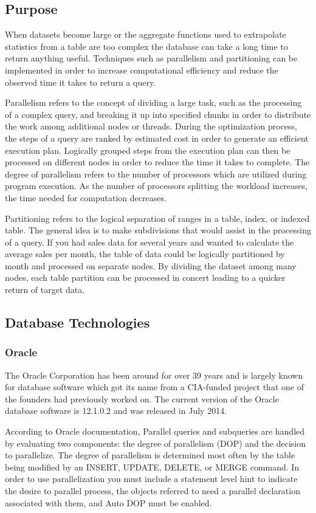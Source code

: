 \documentclass[draftclsnofoot, onecolumn, compsoc, 10pt]{IEEEtran}
\begin{document}
\subsection{Purpose}
When datasets become large or the aggregate functions used to extrapolate statistics from a table are too complex the database can take a long time to return anything useful.
Techniques such as parallelism and partitioning can be implemented in order to increase computational efficiency and reduce the observed time it takes to return a query. 

Parallelism refers to the concept of dividing a large task, such as the processing of a complex query, and breaking it up into specified chunks in order to distribute the work among additional nodes or threads.
During the optimization process, the steps of a query are ranked by estimated cost in order to generate an efficient execution plan.
Logically grouped steps from the execution plan can then be processed on different nodes in order to reduce the time it takes to complete.
The degree of parallelism refers to the number of processors which are utilized during program execution.
As the number of processors splitting the workload increases, the time needed for computation decreases.

Partitioning refers to the logical separation of ranges in a table, index, or indexed table.
The general idea is to make subdivisions that would assist in the processing of a query.
If you had sales data for several years and wanted to calculate the average sales per month, the table of data could be logically partitioned by month and processed on separate nodes.
By dividing the dataset among many nodes, each table partition can be processed in concert leading to a quicker return of target data.

\subsection{Database Technologies}

\subsubsection{Oracle}
The Oracle Corporation has been around for over 39 years and is largely known for database software which got its name from a CIA-funded project that one of the founders had previously worked on.
The current version of the Oracle database software is 12.1.0.2 and was released in July 2014.


According to Oracle documentation, Parallel queries and subqueries are handled by evaluating two components: the degree of parallelism (DOP) and the decision to parallelize.
The degree of parallelism is determined most often by the table being modified by an INSERT, UPDATE, DELETE, or MERGE command.
In order to use parallelization you must include a statement level hint to indicate the desire to parallel process, the objects referred to need a parallel declaration associated with them, and Auto DOP must be enabled.
\end{document}
